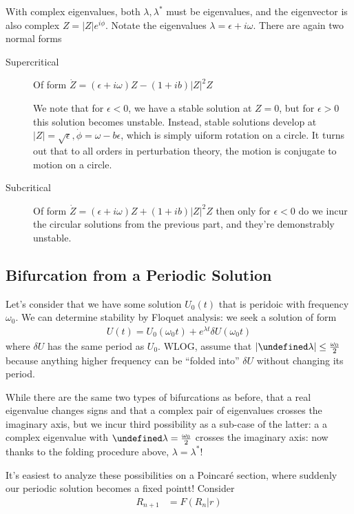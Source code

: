 \documentclass[10pt]{article}
\newcommand{\abs}[1]{\left|#1\right|}
\let\Im\undefined
\DeclareMathOperator{\Im}{Im}
\begin{document}
With complex eigenvalues, both $\lambda, \lambda^*$ must be eigenvalues, and the
eigenvector is also complex $Z = \abs{Z}e^{i\phi}$. Notate the eigenvalues
$\lambda = \epsilon + i\omega$. There are again two normal forms
\begin{description}
    \item[Supercritical] Of form
        $\dot{Z} = (\epsilon + i\omega)Z - (1 + ib)\abs{Z}^2Z$

        We note that for $\epsilon < 0$, we have a stable solution at $Z=0$, but
        for $\epsilon > 0$ this solution becomes unstable. Instead, stable
        solutions develop at $\abs{Z} = \sqrt{\epsilon}, \dot{\phi} = \omega -
        b\epsilon$, which is simply uiform rotation on a circle. It turns out
        that to all orders in perturbation theory, the motion is conjugate to
        motion on a circle.
    \item[Subcritical] Of form
        $\dot{Z} = (\epsilon + i\omega)Z + (1 + ib)\abs{Z}^2Z$
        then only for $\epsilon < 0$ do we incur the circular solutions from the
        previous part, and they're demonstrably unstable.
\end{description}

\subsection{Bifurcation from a Periodic Solution}

Let's consider that we have some solution $U_0(t)$ that is peridoic with frequency
$\omega_0$. We can determine stability by Floquet analysis: we seek a solution
of form
\begin{align}
    U(t) = U_0(\omega_0t) + e^{\lambda t}\delta U(\omega_0 t)
\end{align}
where $\delta U$ has the same period as $U_0$. WLOG, assume that
$\abs{\Im \lambda} \leq \frac{\omega_0}{2}$
because anything higher frequency can be ``folded into'' $\delta U$ without
changing its period.

While there are the same two types of bifurcations as before, that a real
eigenvalue changes signs and that a complex pair of eigenvalues crosses the
imaginary axis, but we incur third possibility as a sub-case of the latter: a
a complex eigenvalue with $\Im \lambda = \frac{\omega_0}{2}$ crosses the
imaginary axis: now thanks to the folding procedure above, $\lambda =
\lambda^*$!

It's easiest to analyze these possibilities on a Poincar\'e section, where
suddenly our periodic solution becomes a fixed pointt! Consider
\begin{align}
    R_{n+1} &= F(R_n|r)
\end{align}
\end{document}
